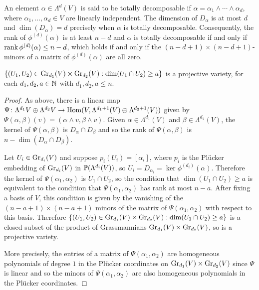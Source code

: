 \documentclass[a4paper, 11pt]{report}
\begin{document}
An element $\alpha\in\Lambda^d(V)$ is said to be totally decomposable if $\alpha = \alpha_1\wedge\cdots\wedge\alpha_d$, where $\alpha_1,\ldots,\alpha_d\in V$ are linearly independent. The dimension of $D_\alpha$ is at most $d$ and $\dim(D_\alpha)=d$ precisely when $\alpha$ is totally decomposable. Consequently, the rank of $\phi^{(d)}(\alpha)$ is at least $n-d$ and $\alpha$ is totally decomposable if and only if $\rank{\phi^{(d)}(\alpha)}\le n-d$, which holds if and only if the $(n-d+1)\times(n-d+1)$-minors of a matrix of $\phi^{(d)}(\alpha)$ are all zero.

\begin{lemma}\label{lemma:grassmannian-incidence-varieties}
$\{(U_1,U_2)\in\GR[d_1]{V}\times\GR[d_2]{V}: \dim(U_1\cap U_2)\geq a\}$ is a projective variety, for each $d_1,d_2,a\in\naturals$ with $d_1,d_2,a\le n$.
\end{lemma}

\begin{proof}
As above, there is a linear map $\Psi\colon\Lambda^{d_1}{V}\oplus\Lambda^{d_2}{V}\to\HOM(V,\Lambda^{d_1+1}(V)\oplus\Lambda^{d_2+1}(V))$ given by $\Psi(\alpha,\beta)(v) = (\alpha\wedge v,\beta\wedge v)$. Given $\alpha\in\Lambda^{d_1}(V)$ and $\beta\in\Lambda^{d_2}(V)$, the kernel of $\Psi(\alpha,\beta)$ is $D_\alpha\cap D_\beta$ and so the rank of $\Psi(\alpha,\beta)$ is $n-\dim(D_\alpha\cap D_\beta)$.

Let $U_i\in\GR[d_i]{V}$ and suppose $p_i(U_i)=[\alpha_i]$, where $p_i$ is the Pl\"ucker embedding of $\GR[d_i]{V}$ in $\Proj{(\Lambda^{d_i}(V))}$, so $U_i = D_{\alpha_i} = \ker{\phi^{(d_i)}(\alpha)}$. Therefore the kernel of $\Psi(\alpha_1,\alpha_2)$ is $U_1\cap U_2$, so the condition that $\dim(U_1\cap U_2)\geq a$ is equivalent to the condition that $\Psi(\alpha_1,\alpha_2)$ has rank at most $n-a$. After fixing a basis of $V$, this condition is given by the vanishing of the $(n-a+1)\times(n-a+1)$ minors of the matrix of $\Psi(\alpha_1,\alpha_2)$ with respect to this basis. Therefore $\{(U_1,U_2)\in\GR[d_1]{V}\times\GR[d_2]{V}:\dim(U_1\cap U_2)\geq a\}$ is a closed subset of the product of Grassmannians $\GR[d_1]{V}\times\GR[d_2]{V}$, so is a projective variety.

More precisely, the entries of a matrix of $\Psi(\alpha_1,\alpha_2)$ are homogeneous polynomials of degree $1$ in the Pl\"ucker coordinates on $\GR[d_1]{V}\times\GR[d_2]{V}$ since $\Psi$ is linear and so the minors of $\Psi(\alpha_1,\alpha_2)$ are also homogeneous polynomials in the Pl\"ucker coordinates.
\end{proof}
\end{document}

